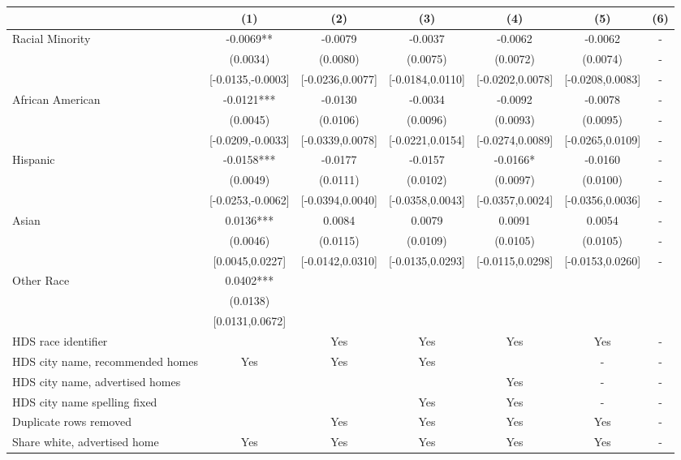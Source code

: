 \begin{table}[htbp]
{\begin{tabular}{l*{6}{c}}
                    \cmidrule(lr){2-2}\cmidrule(lr){3-3}\cmidrule(lr){4-4}\cmidrule(lr){5-5}\cmidrule(lr){6-6}\cmidrule(lr){7-7}
                    &\multicolumn{1}{c}{(1)}   &\multicolumn{1}{c}{(2)}   &\multicolumn{1}{c}{(3)}   &\multicolumn{1}{c}{(4)}   &\multicolumn{1}{c}{(5)}   &\multicolumn{1}{c}{(6)}\\
\midrule
Racial Minority & -0.0069** & -0.0079 & -0.0037 & -0.0062 & -0.0062 & - \\
 & (0.0034) & (0.0080) & (0.0075) & (0.0072) & (0.0074) & - \\
 & [-0.0135,-0.0003] & [-0.0236,0.0077] & [-0.0184,0.0110] & [-0.0202,0.0078] & [-0.0208,0.0083] & - \\
\midrule
African American & -0.0121*** & -0.0130 & -0.0034 & -0.0092 & -0.0078 & - \\
 & (0.0045) & (0.0106) & (0.0096) & (0.0093) & (0.0095) & - \\
 & [-0.0209,-0.0033] & [-0.0339,0.0078] & [-0.0221,0.0154] & [-0.0274,0.0089] & [-0.0265,0.0109] & - \\
Hispanic & -0.0158*** & -0.0177 & -0.0157 & -0.0166* & -0.0160 & - \\
 & (0.0049) & (0.0111) & (0.0102) & (0.0097) & (0.0100) & - \\
 & [-0.0253,-0.0062] & [-0.0394,0.0040] & [-0.0358,0.0043] & [-0.0357,0.0024] & [-0.0356,0.0036] & - \\
Asian & 0.0136*** & 0.0084 & 0.0079 & 0.0091 & 0.0054 & - \\
 & (0.0046) & (0.0115) & (0.0109) & (0.0105) & (0.0105) & - \\
 & [0.0045,0.0227] & [-0.0142,0.0310] & [-0.0135,0.0293] & [-0.0115,0.0298] & [-0.0153,0.0260] & - \\
Other Race & 0.0402*** &  &  &  &  &  \\
 & (0.0138) &  &  &  &  &  \\
 & [0.0131,0.0672] &  &  &  &  &  \\
\midrule
HDS race identifier & & Yes & Yes & Yes & Yes & - \\
HDS city name, recommended homes & Yes & Yes & Yes & & - & -\\
HDS city name, advertised homes &  &  &  & Yes & - & -\\
HDS city name spelling fixed & & & Yes & Yes & - & -\\
Duplicate rows removed &  & Yes & Yes & Yes & Yes & - \\
\midrule
Share white, advertised home  & Yes & Yes & Yes & Yes & Yes & - \\

\end{tabular}}
\end{table}
